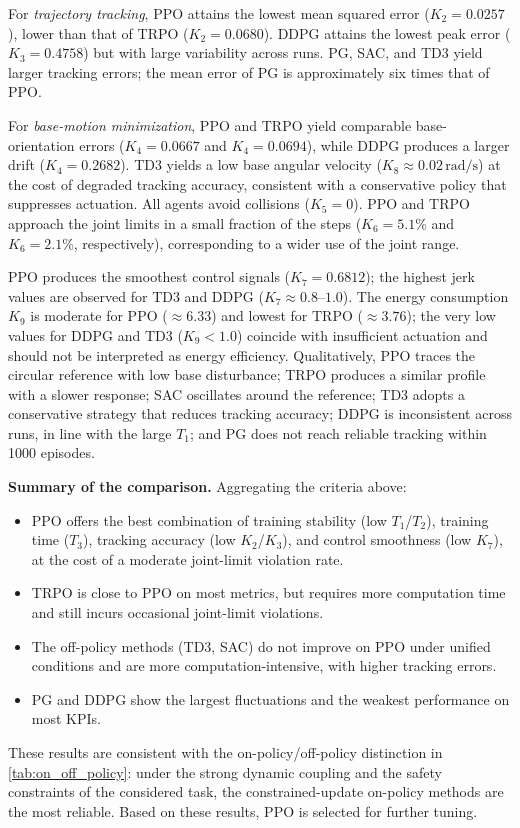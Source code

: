 \documentclass{ieeeaccess}
\begin{document}
For \emph{trajectory tracking}, PPO attains the lowest mean squared error ($K_2 = 0.0257$), lower than that of TRPO ($K_2 = 0.0680$). DDPG attains the lowest peak error ($K_3 = 0.4758$) but with large variability across runs. PG, SAC, and TD3 yield larger tracking errors; the mean error of PG is approximately six times that of PPO.

For \emph{base-motion minimization}, PPO and TRPO yield comparable base-orientation errors ($K_4 = 0.0667$ and $K_4 = 0.0694$), while DDPG produces a larger drift ($K_4 = 0.2682$). TD3 yields a low base angular velocity ($K_8 \approx 0.02\,\mathrm{rad/s}$) at the cost of degraded tracking accuracy, consistent with a conservative policy that suppresses actuation. All agents avoid collisions ($K_5 = 0$). PPO and TRPO approach the joint limits in a small fraction of the steps ($K_6 = 5.1\%$ and $K_6 = 2.1\%$, respectively), corresponding to a wider use of the joint range.

PPO produces the smoothest control signals ($K_7 = 0.6812$); the highest jerk values are observed for TD3 and DDPG ($K_7 \approx 0.8$--$1.0$). The energy consumption $K_9$ is moderate for PPO ($\approx 6.33$) and lowest for TRPO ($\approx 3.76$); the very low values for DDPG and TD3 ($K_9 < 1.0$) coincide with insufficient actuation and should not be interpreted as energy efficiency. Qualitatively, PPO traces the circular reference with low base disturbance; TRPO produces a similar profile with a slower response; SAC oscillates around the reference; TD3 adopts a conservative strategy that reduces tracking accuracy; DDPG is inconsistent across runs, in line with the large $T_1$; and PG does not reach reliable tracking within 1000 episodes.

\textbf{Summary of the comparison.} Aggregating the criteria above:
\begin{itemize}
        \item PPO offers the best combination of training stability (low $T_1$/$T_2$), training time ($T_3$), tracking accuracy (low $K_2$/$K_3$), and control smoothness (low $K_7$), at the cost of a moderate joint-limit violation rate.
        \item TRPO is close to PPO on most metrics, but requires more computation time and still incurs occasional joint-limit violations.
        \item The off-policy methods (TD3, SAC) do not improve on PPO under unified conditions and are more computation-intensive, with higher tracking errors.
        \item PG and DDPG show the largest fluctuations and the weakest performance on most KPIs.
\end{itemize}
These results are consistent with the on-policy/off-policy distinction in \autoref{tab:on_off_policy}: under the strong dynamic coupling and the safety constraints of the considered task, the constrained-update on-policy methods are the most reliable. Based on these results, PPO is selected for further tuning.
\end{document}
